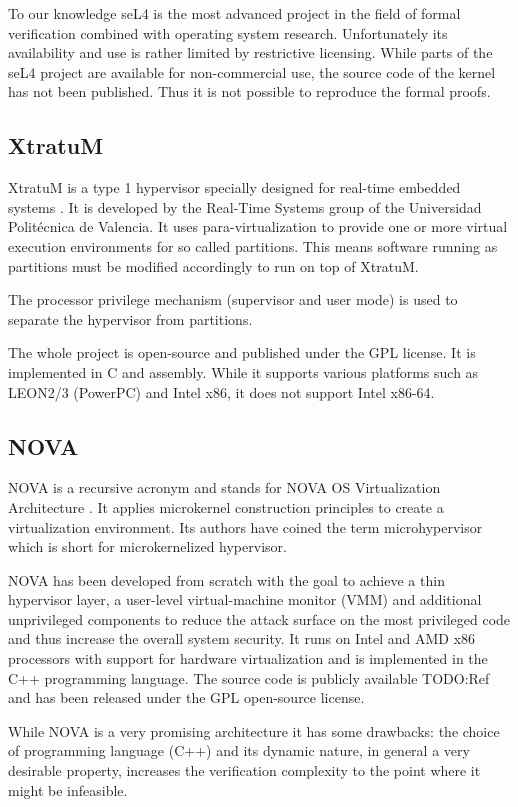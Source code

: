 To our knowledge seL4 is the most advanced project in the field of formal
verification combined with operating system research. Unfortunately its
availability and use is rather limited by restrictive licensing. While parts of
the seL4 project are available for non-commercial use, the source code of the
kernel has not been published. Thus it is not possible to reproduce the formal
proofs.

\subsection{XtratuM}
XtratuM is a type 1 hypervisor specially designed for real-time embedded
systems \cite{xtratum:2009a}. It is developed by the Real-Time Systems group of
the Universidad Politécnica de Valencia. It uses para-virtualization to provide
one or more virtual execution environments for so called partitions. This means
software running as partitions must be modified accordingly to run on top of
XtratuM.

The processor privilege mechanism (supervisor and user mode) is used to
separate the hypervisor from partitions.

The whole project is open-source and published under the GPL license. It is
implemented in C and assembly. While it supports various platforms such as
LEON2/3 (PowerPC) and Intel x86, it does not support Intel x86-64.

\subsection{NOVA}
NOVA is a recursive acronym and stands for NOVA OS Virtualization Architecture
\cite{Steinberg:2010:NMS:1755913.1755935}. It applies microkernel construction
principles to create a virtualization environment. Its authors have coined
the term microhypervisor which is short for
microkernelized hypervisor.

NOVA has been developed from scratch with the goal to achieve a thin hypervisor
layer, a user-level virtual-machine monitor (VMM) and additional unprivileged
components to reduce the attack surface on the most privileged code and thus
increase the overall system security. It runs on Intel and AMD x86 processors
with support for hardware virtualization and is implemented in the C++
programming language. The source code is publicly available TODO:Ref and has
been released under the GPL open-source license.

While NOVA is a very promising architecture it has some drawbacks: the choice of
programming language (C++) and its dynamic nature, in general a very desirable
property, increases the verification complexity to the point where it might be
infeasible.

